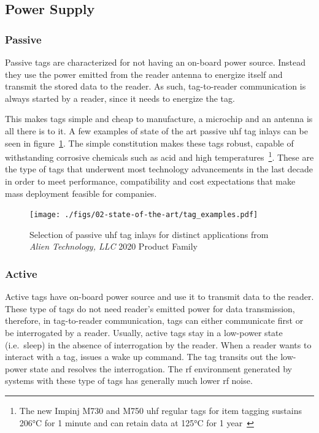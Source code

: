 \subsection{Power Supply}

\subsubsection{Passive}

Passive tags are characterized for not having an on-board power source. 
Instead they use the power emitted from the reader antenna to energize itself and transmit the stored data to the reader.
As such, tag-to-reader communication is always started by a reader, since it needs to energize the tag.

This makes tags simple and cheap to manufacture, a microchip and an antenna is all there is to it. A few examples of state of the art passive \ac{uhf} tag inlays can be seen in figure~\ref{fig:alienAlienProductFamily2020}.
The simple constitution makes these tags robust, capable of withstanding corrosive chemicals such as acid and high temperatures~\footnote{The new Impinj M730 and M750 \ac{uhf} regular tags for item tagging sustains \ang{206}C for 1 minute and can retain data at \ang{125}C for 1 year~\cite[Tab. 18]{ImpinjM730M750}}.
These are the type of tags that underwent most technology advancements in the last decade in order to meet performance, compatibility and cost expectations that make mass deployment feasible for companies.

\begin{figure}[!ht]
    \centering
    \texttt{[image: ./figs/02-state-of-the-art/tag\_examples.pdf]}
    \caption{Selection of passive \ac{uhf} tag inlays for distinct applications from \textit{Alien Technology, LLC} 2020 Product Family~\cite{alienAlienProductFamily2020}} 
    \label{fig:alienAlienProductFamily2020}
\end{figure}

\subsubsection{Active}

Active tags have on-board power source and use it to transmit data to the reader.
These type of tags do not need reader's emitted power for data transmission, therefore, in tag-to-reader communication, tags can either communicate first or be interrogated by a reader.
Usually, active tags stay in a low-power state (i.e.\ sleep) in the absence of interrogation by the reader. When a reader wants to interact with a tag, issues a wake up command. The tag transits out the low-power state and resolves the interrogation.
The \ac{rf} environment generated by systems with these type of tags has generally much lower \ac{rf} noise.

